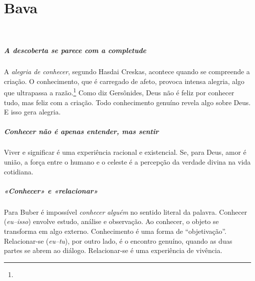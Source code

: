 

\chapter*{Bava 
\smallskip{}}

\begin{center}
{\huge{}}\\\medskip{\footnotesize\formularlight{
\lipsum[2]
}}
\end{center}

\paragraph{A descoberta se parece com a completude} A \textit{alegria de conhecer}, segundo Hasdai Creskas, acontece quando se compreende a criação. O conhecimento, que é carregado de afeto, provoca intensa alegria, algo que ultrapassa a razão.\footnote{} Como diz Gersônides, Deus não é feliz por conhecer tudo, mas feliz com a criação. Todo conhecimento genuíno revela algo sobre Deus. E isso gera alegria.

\paragraph{Conhecer não é apenas entender, mas sentir} Viver e significar é uma experiência racional e existencial. Se, para Deus, amor é união, a força entre o humano e o celeste é a percepção da verdade divina na vida cotidiana.

\paragraph{«Conhecer» e «relacionar»} Para Buber é impossível \textit{conhecer alguém} no sentido literal da palavra. Conhecer (\textit{eu--isso}) envolve estudo, análise e observação. Ao conhecer, o objeto se transforma em algo externo. Conhecimento é uma forma de ``objetivação''. Relacionar-se (\textit{eu--tu}), por outro lado, é o encontro genuíno, quando as duas partes se abrem ao diálogo. Relacionar-se é uma experiência de vivência.

